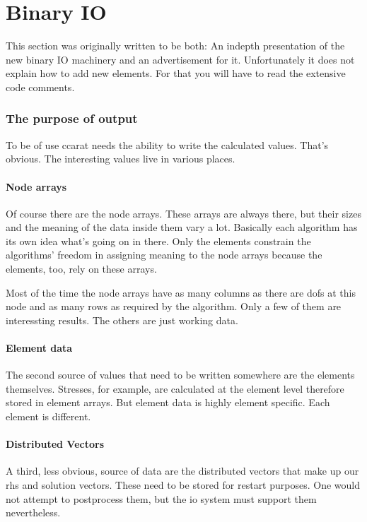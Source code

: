 \chapter{Binary IO}

This section was originally written to be both: An indepth presentation
of the new binary IO machinery and an advertisement for it. Unfortunately
it does not explain how to add new elements. For that you will have
to read the extensive code comments.


\subsection{The purpose of output}

To be of use ccarat needs the ability to write the calculated values.
That's obvious. The interesting values live in various places.


\subsubsection{Node arrays}

Of course there are the node arrays. These arrays are always there,
but their sizes and the meaning of the data inside them vary a lot.
Basically each algorithm has its own idea what's going on in there.
Only the elements constrain the algorithms' freedom in assigning meaning
to the node arrays because the elements, too, rely on these arrays.

Most of the time the node arrays have as many columns as there are
dofs at this node and as many rows as required by the algorithm. Only
a few of them are interessting results. The others are just working
data.


\subsubsection{Element data}

The second source of values that need to be written somewhere are
the elements themselves. Stresses, for example, are calculated at
the element level therefore stored in element arrays. But element
data is highly element specific. Each element is different.


\subsubsection{Distributed Vectors}

A third, less obvious, source of data are the distributed vectors
that make up our rhs and solution vectors. These need to be stored
for restart purposes. One would not attempt to postprocess them, but
the io system must support them nevertheless.


